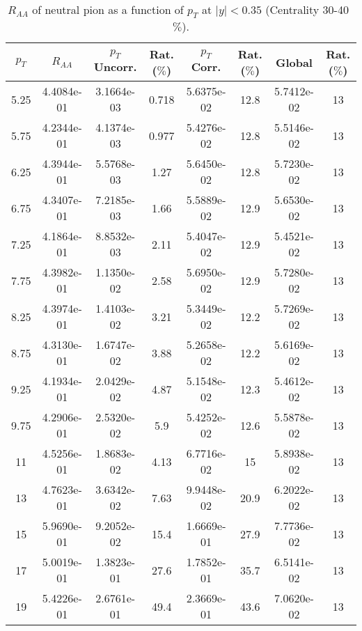             
\begin{table}[!htb]
\centering
\begin{tabular}{|c|c|c|c|c|c|c|c|}
\hline
$p_{T}$ & $R_{AA}$ & $p_{T}$ Uncorr. & Rat. ($\%$) & $p_{T}$ Corr. & Rat. ($\%$) & Global & Rat. ($\%$)\\
\hline
5.25 & 4.4084e-01 & 3.1664e-03 & 0.718 & 5.6375e-02 & 12.8 & 5.7412e-02 & 13 \\ 
5.75 & 4.2344e-01 & 4.1374e-03 & 0.977 & 5.4276e-02 & 12.8 & 5.5146e-02 & 13 \\ 
6.25 & 4.3944e-01 & 5.5768e-03 & 1.27 & 5.6450e-02 & 12.8 & 5.7230e-02 & 13 \\ 
6.75 & 4.3407e-01 & 7.2185e-03 & 1.66 & 5.5889e-02 & 12.9 & 5.6530e-02 & 13 \\ 
7.25 & 4.1864e-01 & 8.8532e-03 & 2.11 & 5.4047e-02 & 12.9 & 5.4521e-02 & 13 \\ 
7.75 & 4.3982e-01 & 1.1350e-02 & 2.58 & 5.6950e-02 & 12.9 & 5.7280e-02 & 13 \\ 
8.25 & 4.3974e-01 & 1.4103e-02 & 3.21 & 5.3449e-02 & 12.2 & 5.7269e-02 & 13 \\ 
8.75 & 4.3130e-01 & 1.6747e-02 & 3.88 & 5.2658e-02 & 12.2 & 5.6169e-02 & 13 \\ 
9.25 & 4.1934e-01 & 2.0429e-02 & 4.87 & 5.1548e-02 & 12.3 & 5.4612e-02 & 13 \\ 
9.75 & 4.2906e-01 & 2.5320e-02 & 5.9 & 5.4252e-02 & 12.6 & 5.5878e-02 & 13 \\ 
11 & 4.5256e-01 & 1.8683e-02 & 4.13 & 6.7716e-02 & 15 & 5.8938e-02 & 13 \\ 
13 & 4.7623e-01 & 3.6342e-02 & 7.63 & 9.9448e-02 & 20.9 & 6.2022e-02 & 13 \\ 
15 & 5.9690e-01 & 9.2052e-02 & 15.4 & 1.6669e-01 & 27.9 & 7.7736e-02 & 13 \\ 
17 & 5.0019e-01 & 1.3823e-01 & 27.6 & 1.7852e-01 & 35.7 & 6.5141e-02 & 13 \\ 
19 & 5.4226e-01 & 2.6761e-01 & 49.4 & 2.3669e-01 & 43.6 & 7.0620e-02 & 13 \\ 
\hline
\end{tabular}
\caption{$R_{AA}$ of neutral pion as a function of $p_{T}$ at $|y|<0.35$ (Centrality 30-40~$\%$).}
\end{table}
            
